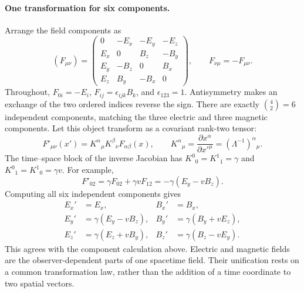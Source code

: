 \documentclass[11pt,openany]{book}
\numberwithin{equation}{chapter}
\theoremstyle{definition}
\theoremstyle{remark}
\begin{document}
\paragraph{One transformation for six components.}
Arrange the field components as
\[
(F_{\mu\nu})=
\begin{pmatrix}
0&-E_x&-E_y&-E_z\\
E_x&0&B_z&-B_y\\
E_y&-B_z&0&B_x\\
E_z&B_y&-B_x&0
\end{pmatrix},\qquad F_{\nu\mu}=-F_{\mu\nu}.
\]
Throughout, $F_{0i}=-E_i$, $F_{ij}=\epsilon_{ijk}B_k$, and $\epsilon_{123}=1$.
Antisymmetry makes an exchange of the two ordered indices reverse the sign.
There are exactly $\binom42=6$ independent components, matching the three electric
and three magnetic components. Let this object transform as a covariant rank-two tensor:
\[
F'_{\mu\nu}(x')=K^\alpha{}_\mu K^\beta{}_\nu F_{\alpha\beta}(x),
\qquad K^\alpha{}_\mu=\frac{\partial x^\alpha}{\partial x'^\mu}
=(\Lambda^{-1})^\alpha{}_\mu.
\]
The time--space block of the inverse Jacobian has
$K^0{}_0=K^1{}_1=\gamma$ and $K^0{}_1=K^1{}_0=\gamma v$.
For example,
\[
F'_{02}=\gamma F_{02}+\gamma vF_{12}
=-\gamma(E_y-vB_z).
\]
Computing all six independent components gives
\[
\boxed{\begin{aligned}
E_x'&=E_x,& B_x'&=B_x,\\
E_y'&=\gamma(E_y-vB_z),& B_y'&=\gamma(B_y+vE_z),\\
E_z'&=\gamma(E_z+vB_y),& B_z'&=\gamma(B_z-vE_y).
\end{aligned}}
\]
This agrees with the component calculation above. Electric and magnetic fields are
the observer-dependent parts of one spacetime field. Their unification rests on
a common transformation law, rather than the addition of a time coordinate to two spatial vectors.
\end{document}
